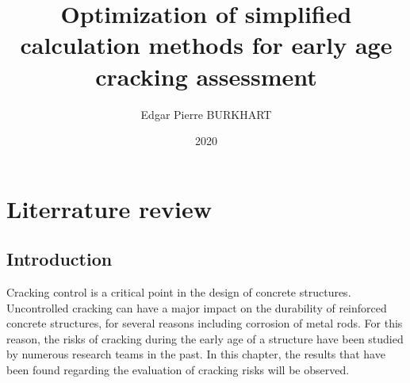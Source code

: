 \documentclass{report}
\title{Optimization of simplified calculation methods for early age cracking assessment}
\author{Edgar Pierre BURKHART}
\date{2020}
\begin{document}
\maketitle

\tableofcontents

\chapter{Literrature review}

\section{Introduction}

Cracking control is a critical point in the design of concrete structures.
Uncontrolled cracking can have a major impact on the durability of reinforced
concrete structures, for several reasons including corrosion of metal rods.
For this reason, the risks of cracking during the early age of a structure have
been studied by numerous research teams in the past. In this chapter, the
results that have been found regarding the evaluation of cracking risks will be
observed.

\section{}
\end{document}
